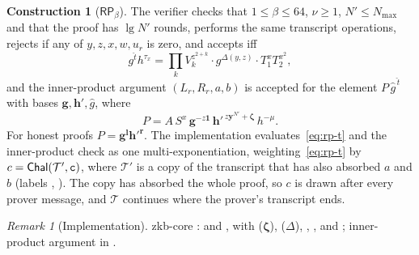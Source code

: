 \documentclass[11pt]{article}
\theoremstyle{definition}
\newtheorem{construction}[lemma]{Construction}
\theoremstyle{remark}
\newtheorem{remark}[lemma]{Remark}
\newcommand{\RP}{\mathsf{RP}}
\newcommand{\bv}{\mathbf}
\newcommand{\one}{\mathbf 1}
\newcommand{\tr}{\mathcal{T}}
\newcommand{\lbl}[1]{\text{\texttt{#1}}}
\begin{document}
\begin{construction}[$\RP_\beta$]
The verifier checks that $1\le\beta\le64$, $\nu\ge1$, $N'\le N_{\max}$ and that the proof has $\lg N'$ rounds, performs the same transcript operations, rejects if any of $y,z,x,w,u_r$ is zero, and accepts iff
\begin{equation}
  g^{\hat t}h^{\tau_x}=\prod_kV_k^{z^{2+k}}\cdot g^{\Delta(y,z)}\cdot T_1^xT_2^{x^2},\label{eq:rp-t}
\end{equation}
and the inner-product argument $(L_r,R_r,a,b)$ is accepted for the element $P\,\hat g^{\,\hat t}$ with bases $\bv g,\bv h',\hat g$, where
\begin{equation}
  P=A\,S^x\,\bv g^{-z\one}\,\bv h'^{\,z\bv y^{N'}+\boldsymbol\zeta}\,h^{-\mu}.\label{eq:rp-ipa}
\end{equation}
For honest proofs $P=\bv g^{\bv l}\bv h'^{\bv r}$.
The implementation evaluates~\eqref{eq:rp-t} and the inner-product check as one multi-exponentiation, weighting~\eqref{eq:rp-t} by $c=\mathsf{Chal}(\tr',\lbl{c})$, where $\tr'$ is a copy of the transcript that has also absorbed $a$ and $b$ (labels , ). The copy has absorbed the whole proof, so $c$ is drawn after every prover message, and $\tr$ continues where the prover's transcript ends.
\end{construction}

\begin{remark}[Implementation]\label{rem:impl-rp}
zkb-core :  and , with  ($\boldsymbol\zeta$),  ($\Delta$), , ,  and ; inner-product argument in .
\end{remark}
\end{document}
